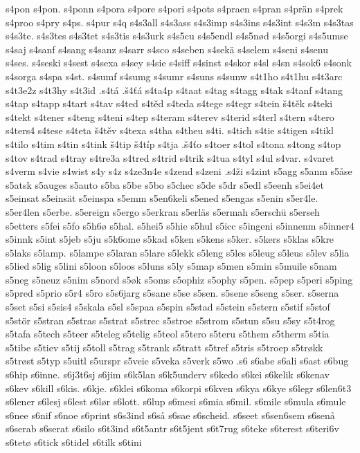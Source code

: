 {{s4pon
s4pon.
s4ponn
s4pora
s4pore
s4pori
s4pots
s4praen
s4pran
s4prän
s4prek
s4proo
s4pry
s4ps.
s4pur
s4q
s4s3all
s4s3ass
s4s3imp
s4s3ins
s4s3int
s4s3m
s4s3tas
s4s3te.
s4s3tes
s4s3tet
s4s3tis
s4s3urk
s4s5cu
s4s5endl
s4s5nød
s4s5orgi
s4s5umse
s4saj
s4sanf
s4sang
s4sanz
s4sarr
s4sco
s4seben
s4sekä
s4selem
s4seni
s4senu
s4ses.
s4seski
s4sest
s4sexa
s4sey
s4sie
s4siff
s4sinst
s4skor
s4sl
s4sn
s4sok6
s4sonk
s4sorga
s4spa
s4st.
s4sumf
s4sumg
s4sumr
s4suns
s4sunw
s4t1ho
s4t1hu
s4t3arc
s4t3e2z
s4t3hy
s4t3id
.s4tá
.š4ťá
s4ta4p
s4taat
s4tag
s4tagg
s4tak
s4tanf
s4tang
s4tap
s4tapp
s4tart
s4tav
s4ted
s4těd
s4teda
s4tege
s4tegr
s4tein
š4těk
s4teki
s4tekt
s4tener
s4teng
s4teni
s4tep
s4teram
s4terev
s4terid
s4terl
s4tern
s4tero
s4ters4
s4tese
s4teta
š4těv
s4texa
s4tha
s4theu
s4ti.
s4tich
s4tie
s4tigen
s4tikl
s4tilo
s4tim
s4tin
s4tink
š4tip
š4típ
s4tja
.š4ťo
s4toer
s4tol
s4tona
s4tong
s4top
s4tov
s4trad
s4tray
s4tre3a
s4tred
s4trid
s4trik
s4tua
s4tyl
s4ul
s4var.
s4varet
s4verm
s4vie
s4wist
s4y
s4z
s4ze3n4e
s4zend
s4zeni
.s4ži
s4zint
s5agg
s5anm
s5åse
s5atsk
s5auges
s5auto
s5ba
s5be
s5bo
s5chec
s5de
s5dr
s5edl
s5eenh
s5ei4et
s5einsat
s5einsät
s5einspa
s5emm
s5en6keli
s5ened
s5engas
s5enin
s5er4le.
s5er4len
s5erbe.
s5ereign
s5ergo
s5erkran
s5erläs
s5ermah
s5erschü
s5erseh
s5etters
s5fei
s5fo
s5h6ø
s5hal.
s5hei5
s5hie
s5hul
s5icc
s5ingeni
s5innenm
s5inner4
s5innk
s5int
s5jeb
s5ju
s5k6ome
s5kad
s5ken
s5kens
s5ker.
s5kers
s5klas
s5kre
s5laks
s5lamp.
s5lampe
s5laran
s5lare
s5lekk
s5leng
s5les
s5leug
s5leus
s5lev
s5lia
s5lied
s5lig
s5lini
s5loon
s5loos
s5luns
s5ly
s5map
s5men
s5min
s5muile
s5nam
s5neg
s5neuz
s5nim
s5nord
s5øk
s5oms
s5ophiz
s5ophy
s5pen.
s5pep
s5peri
s5ping
s5pred
s5prio
s5r4
s5ro
s5s6jarg
s5sane
s5se
s5sen.
s5sene
s5seng
s5ser.
s5serna
s5set
s5si
s5sis4
s5skala
s5sl
s5spaa
s5spin
s5stad
s5stein
s5stern
s5stif
s5stof
s5stör
s5stran
s5stras
s5strat
s5strec
s5stroe
s5strom
s5stun
s5su
s5sy
s5t4rog
s5tafa
s5tech
s5teer
s5teleg
s5telig
s5teol
s5tero
s5teru
s5them
s5therm
s5tia
s5tibe
s5tiev
s5tij
s5toll
s5trag
s5trank
s5tratt
s5tref
s5tris
s5troep
s5trøkk
s5trøst
s5typ
s5uitl
s5urspr
s5veie
s5veka
s5verk
s5wo
.s6
s6abe
s6ali
s6ast
s6bug
s6hip
s6inne.
s6j3t6sj
s6jim
s6k5lan
s6k5underv
s6kedo
s6kei
s6kelik
s6kenav
s6kev
s6kill
s6kis.
s6kje.
s6klei
s6koma
s6korpi
s6kven
s6kya
s6kye
s6legr
s6len6t3
s6lener
s6lesj
s6lest
s6lør
s6lott.
s6lup
s6mesi
s6mia
s6mil.
s6mile
s6mula
s6mule
s6nee
s6nif
s6noe
s6print
s6s3ind
s6så
s6sae
s6scheid.
s6seet
s6sen6sem
s6senå
s6serab
s6serat
s6silo
s6t3ind
s6t5antr
s6t5jent
s6t7rug
s6teke
s6terest
s6teri6v
s6tetø
s6tick
s6tidel
s6tilk
s6tini
}}
